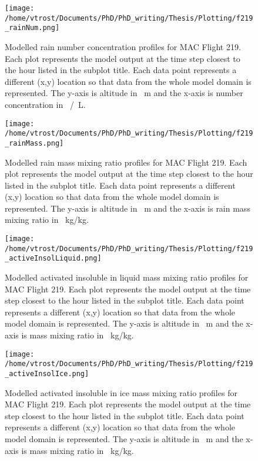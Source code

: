 \begin{figure}[H]
	\centering
	\texttt{[image: /home/vtrost/Documents/PhD/PhD\_writing/Thesis/Plotting/f219\_rainNum.png]}
	\caption{Modelled rain number concentration profiles for MAC Flight 219. Each plot represents the model output at the time step closest to the hour listed in the subplot title. Each data point represents a different (x,y) location so that data from the whole model domain is represented. The y-axis is altitude in \SI{}{m} and the x-axis is number concentration in \SI{}{/L}.}
	\label{fig:moncRain}
\end{figure}

\begin{figure}[H]
	\centering
	\texttt{[image: /home/vtrost/Documents/PhD/PhD\_writing/Thesis/Plotting/f219\_rainMass.png]}
	\caption{Modelled rain mass mixing ratio profiles for MAC Flight 219. Each plot represents the model output at the time step closest to the hour listed in the subplot title. Each data point represents a different (x,y) location so that data from the whole model domain is represented. The y-axis is altitude in \SI{}{m} and the x-axis is rain mass mixing ratio in \SI{}{kg/kg}.}
\end{figure}


\begin{figure}[H]
	\centering
	\texttt{[image: /home/vtrost/Documents/PhD/PhD\_writing/Thesis/Plotting/f219\_activeInsolLiquid.png]}
	\caption{Modelled activated insoluble in liquid mass mixing ratio profiles for MAC Flight 219. Each plot represents the model output at the time step closest to the hour listed in the subplot title. Each data point represents a different (x,y) location so that data from the whole model domain is represented. The y-axis is altitude in \SI{}{m} and the x-axis is mass mixing ratio in \SI{}{kg/kg}.}
\end{figure}

\begin{figure}[H]
	\centering
	\texttt{[image: /home/vtrost/Documents/PhD/PhD\_writing/Thesis/Plotting/f219\_activeInsolIce.png]}
	\caption{Modelled activated insoluble in ice mass mixing ratio profiles for MAC Flight 219. Each plot represents the model output at the time step closest to the hour listed in the subplot title. Each data point represents a different (x,y) location so that data from the whole model domain is represented. The y-axis is altitude in \SI{}{m} and the x-axis is mass mixing ratio in \SI{}{kg/kg}.}
\end{figure}

